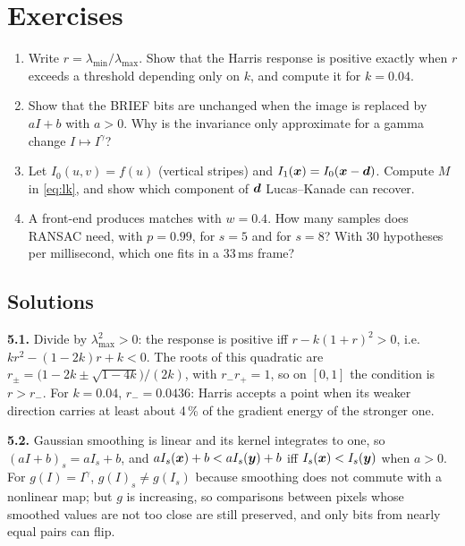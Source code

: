 \FloatBarrier
\section*{Exercises}

\begin{enumerate}[label=\textbf{5.\arabic*},ref=5.\arabic*]
\item\label{ex:5harris} Write $r=\lambda_{\min}/\lambda_{\max}$. Show
  that the Harris response is positive exactly when $r$ exceeds a
  threshold depending only on $k$, and compute it for $k=0.04$.
\item\label{ex:5affine} Show that the BRIEF bits are unchanged when the
  image is replaced by $aI+b$ with $a>0$. Why is the invariance only
  approximate for a gamma change $I\mapsto I^\gamma$?
\item\label{ex:5aperture} Let $I_0(u,v)=f(u)$ (vertical stripes) and
  $I_1(\bm{x})=I_0(\bm{x}-\bm{d})$. Compute $M$ in
  \eqref{eq:lk}, and show which component of $\bm{d}$ Lucas--Kanade can
  recover.
\item\label{ex:5ransac} A front-end produces matches with $w=0.4$. How
  many samples does RANSAC need, with $p=0.99$, for $s=5$ and for $s=8$?
  With 30 hypotheses per millisecond, which one fits in a 33\,ms frame?
\end{enumerate}

\subsection*{Solutions}

\textbf{5.1.} Divide by $\lambda_{\max}^2>0$: the response is positive
iff $r-k(1+r)^2>0$, i.e.\ $kr^2-(1-2k)r+k<0$. The roots of this
quadratic are $r_\pm=\bigl(1-2k\pm\sqrt{1-4k}\bigr)/(2k)$, with
$r_-r_+=1$, so on $[0,1]$ the condition is $r>r_-$. For $k=0.04$,
$r_-=0.0436$: Harris accepts a point when its weaker direction carries
at least about 4\,\% of the gradient energy of the stronger one.

\textbf{5.2.} Gaussian smoothing is linear and its kernel integrates to
one, so $(aI+b)_s=aI_s+b$, and $aI_s(\bm{x})+b<aI_s(\bm{y})+b$ iff
$I_s(\bm{x})<I_s(\bm{y})$ when $a>0$. For $g(I)=I^\gamma$,
$g(I)_s\neq g(I_s)$ because smoothing does not commute with a nonlinear
map; but $g$ is increasing, so comparisons between pixels whose
smoothed values are not too close are still preserved, and only bits
from nearly equal pairs can flip.

